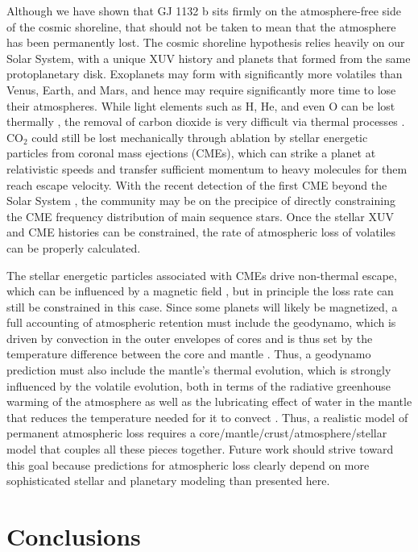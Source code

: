 \documentclass[preprint]{aastex631}
\begin{document}
Although we have shown that GJ 1132 b sits firmly on the atmosphere-free side of the cosmic shoreline, that should not be taken to mean that the atmosphere has been permanently lost. The cosmic shoreline hypothesis relies heavily on our Solar System, with a unique XUV history and planets that formed from the same protoplanetary disk. Exoplanets may form with significantly more volatiles than Venus, Earth, and Mars, and hence may require significantly more time to lose their atmospheres. While light elements such as H, He, and even O can be lost thermally \citep{Zahnle90}, the removal of carbon dioxide is very difficult via thermal processes \citep{KrissansenTottonFortney22}. CO$_2$ could still be lost mechanically through ablation by stellar energetic particles from coronal mass ejections (CMEs), which can strike a planet at relativistic speeds and transfer sufficient momentum to heavy molecules for them reach escape velocity. With the recent detection of the first CME beyond the Solar System \citep{Callingham25}, the community may be on the precipice of directly constraining the CME frequency distribution of main sequence stars. Once the stellar XUV and CME histories can be constrained, the rate of atmospheric loss of volatiles can be properly calculated. 

The stellar energetic particles associated with CMEs drive non-thermal escape, which can be influenced by a magnetic field \citep{DriscollBercovici13,Gunell18}, but in principle the loss rate can still be constrained in this case. Since some planets will likely be magnetized, a full accounting of atmospheric retention must include the geodynamo, which is driven by convection in the outer envelopes of cores and is thus set by the temperature difference between the core and mantle \citep{olson2006,DriscollBarnes15}. Thus, a geodynamo prediction must also include the mantle's thermal evolution, which is strongly influenced by the volatile evolution, both in terms of the radiative greenhouse warming of the atmosphere as well as the lubricating effect of water in the mantle that reduces the temperature needed for it to convect \citep{FoleyDriscoll16,McGovernSchubert89,Garcia25}. Thus, a realistic model of permanent atmospheric loss requires a core/mantle/crust/atmosphere/stellar model that couples all these pieces together. Future work should strive toward this goal because predictions for atmospheric loss clearly depend on more sophisticated stellar and planetary modeling than presented here. 

\section{Conclusions\label{sec:conclusions}}
\end{document}
